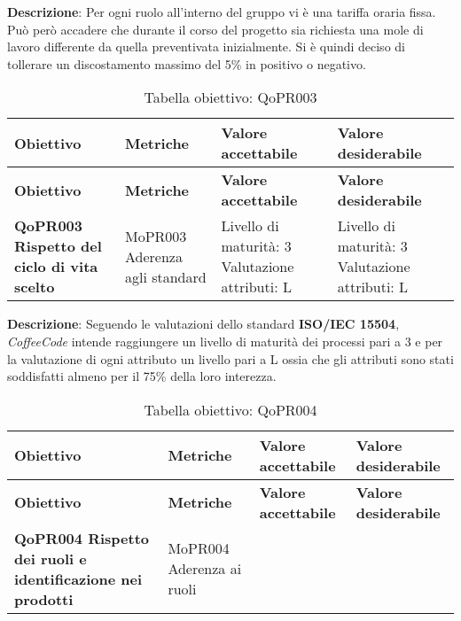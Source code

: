 \documentclass[../piano-di-qualifica.tex]{subfiles}
\begin{document}
\textbf{Descrizione}: Per ogni ruolo all’interno del gruppo vi è una tariffa oraria fissa. Può però accadere che durante il corso del progetto sia richiesta una mole di lavoro differente da quella preventivata inizialmente. Si è quindi deciso di tollerare un discostamento massimo del 5\% in positivo o negativo.


\renewcommand{\arraystretch}{2} %
\begin{longtable}[H]{>{\centering\bfseries}m{5cm} >{\centering}m{5cm} >{\centering}m{2.5cm} >{\centering\arraybackslash}m{2.5cm}}  
    \caption{Tabella obiettivo: QoPR003}%
    \label{tab:obiettivo_qopr003} \\
  \rowcolor{lightgray}
  {\textbf{Obiettivo}} & {\textbf{Metriche}} & {\textbf{Valore accettabile}} & {\textbf{Valore desiderabile}}  \\
  \endfirsthead%
  \rowcolor{lightgray}
  {\textbf{Obiettivo}} & {\textbf{Metriche}} & {\textbf{Valore accettabile}} & {\textbf{Valore desiderabile}}  \\
  \endhead%
  \textbf{QoPR003 Rispetto del ciclo di vita scelto} & MoPR003 Aderenza agli standard & Livello di maturità: 3 Valutazione attributi: L & Livello di maturità: 3 Valutazione attributi: L \\
\end{longtable}

\textbf{Descrizione}: Seguendo le valutazioni dello standard \textbf{ISO/IEC 15504}, \emph{CoffeeCode} intende raggiungere un livello di maturità dei processi pari a 3 e per la valutazione di ogni attributo un livello pari a L ossia che gli attributi sono stati soddisfatti almeno per il 75\% della loro interezza.


\renewcommand{\arraystretch}{2} %
\begin{longtable}[H]{>{\centering\bfseries}m{5cm} >{\centering}m{5cm} >{\centering}m{2.5cm} >{\centering\arraybackslash}m{2.5cm}}  
    \caption{Tabella obiettivo: QoPR004}%
    \label{tab:obiettivo_qopr004} \\
  \rowcolor{lightgray}
  {\textbf{Obiettivo}} & {\textbf{Metriche}} & {\textbf{Valore accettabile}} & {\textbf{Valore desiderabile}}  \\
  \endfirsthead%
  \rowcolor{lightgray}
  {\textbf{Obiettivo}} & {\textbf{Metriche}} & {\textbf{Valore accettabile}} & {\textbf{Valore desiderabile}}  \\
  \endhead%
  \textbf{QoPR004 Rispetto dei ruoli e identificazione nei prodotti} & MoPR004 Aderenza ai ruoli & 0 & 0 \\
\end{longtable}
\end{document}
